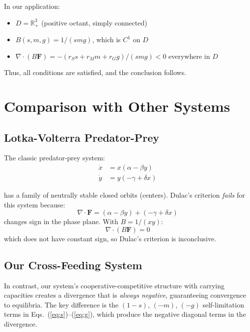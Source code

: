 \documentclass[11pt]{article}
\begin{document}
In our application:
\begin{itemize}
    \item $D = \mathbb{R}^3_+$ (positive octant, simply connected)
    \item $B(s,m,g) = 1/(smg)$, which is $C^1$ on $D$
    \item $\nabla \cdot (B \mathbf{F}) = -(r_S s + r_M m + r_G g)/(smg) < 0$ everywhere in $D$
\end{itemize}

Thus, all conditions are satisfied, and the conclusion follows.

\section{Comparison with Other Systems}

\subsection{Lotka-Volterra Predator-Prey}

The classic predator-prey system:
\begin{align*}
\dot{x} &= x(\alpha - \beta y)\\
\dot{y} &= y(-\gamma + \delta x)
\end{align*}

has a family of neutrally stable closed orbits (centers). Dulac's criterion \emph{fails} for this system because:
\begin{equation}
\nabla \cdot \mathbf{F} = (\alpha - \beta y) + (-\gamma + \delta x)
\end{equation}
changes sign in the phase plane. With $B = 1/(xy)$:
\begin{equation}
\nabla \cdot (B \mathbf{F}) = 0
\end{equation}
which does not have constant sign, so Dulac's criterion is inconclusive.

\subsection{Our Cross-Feeding System}

In contrast, our system's cooperative-competitive structure with carrying capacities creates a divergence that is \emph{always negative}, guaranteeing convergence to equilibria. The key difference is the $(1 - s)$, $(- m)$, $(- g)$ self-limitation terms in Eqs.~(\ref{eq:s})--(\ref{eq:g}), which produce the negative diagonal terms in the divergence.
\end{document}

